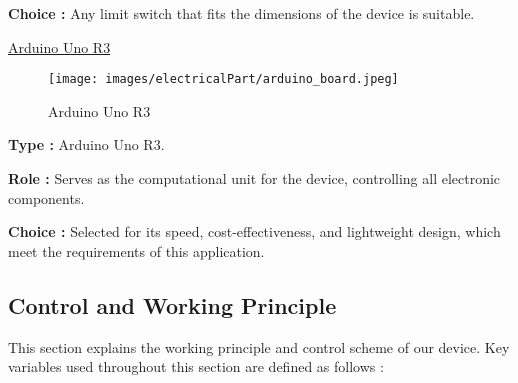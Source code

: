 \documentclass[lettersize,journal]{IEEEtran}
\begin{document}
\medskip \noindent \textbf{Choice :} Any limit switch that fits the dimensions of the device is suitable.


\bigskip

\noindent \underline{Arduino Uno R3}

\begin{figure}[!h]
    \centering
    \texttt{[image: images/electricalPart/arduino\_board.jpeg]}
    \caption{\centering Arduino Uno R3}
    \label{fig:IMU}
\end{figure}


\noindent \textbf{Type :} Arduino Uno R3.

\medskip \noindent \textbf{Role :} Serves as the computational unit for the device, controlling all electronic components.

\medskip \noindent \textbf{Choice :} Selected for its speed, cost-effectiveness, and lightweight design, which meet the requirements of this application.

\subsection{Control and Working Principle}

This section explains the working principle and control scheme of our device. Key variables used throughout this section are defined as follows :
\end{document}

